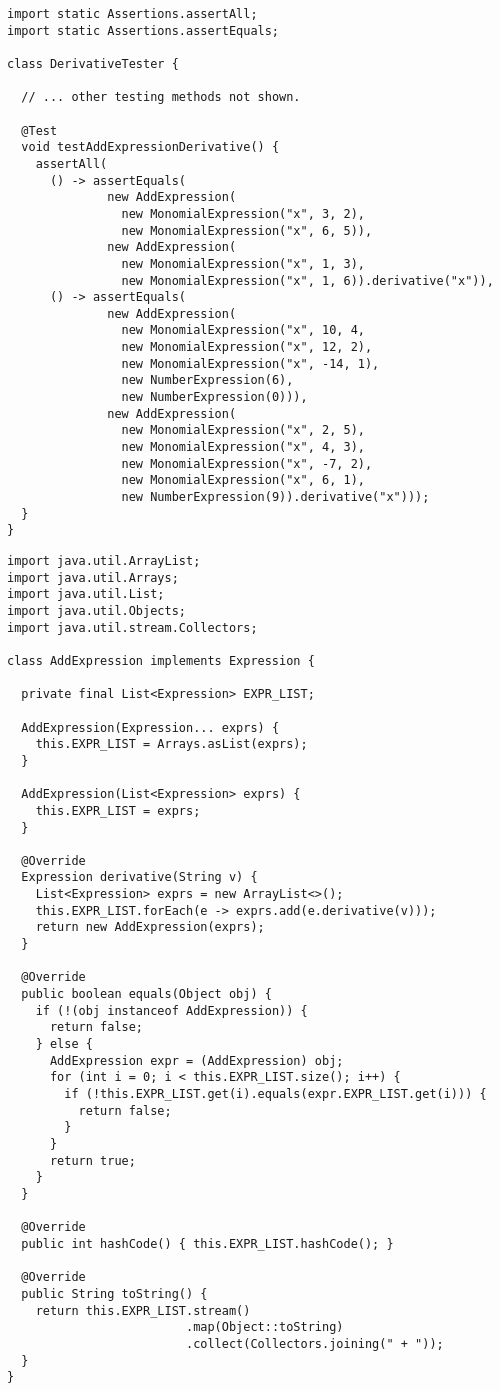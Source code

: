 \begin{lstlisting}[language=MyJava]
import static Assertions.assertAll;
import static Assertions.assertEquals;
  
class DerivativeTester {
  
  // ... other testing methods not shown.

  @Test
  void testAddExpressionDerivative() {
    assertAll(
      () -> assertEquals(
              new AddExpression(
                new MonomialExpression("x", 3, 2),
                new MonomialExpression("x", 6, 5)),
              new AddExpression(
                new MonomialExpression("x", 1, 3),
                new MonomialExpression("x", 1, 6)).derivative("x")),
      () -> assertEquals(
              new AddExpression(
                new MonomialExpression("x", 10, 4,
                new MonomialExpression("x", 12, 2),
                new MonomialExpression("x", -14, 1),
                new NumberExpression(6),
                new NumberExpression(0))),
              new AddExpression(
                new MonomialExpression("x", 2, 5),
                new MonomialExpression("x", 4, 3),
                new MonomialExpression("x", -7, 2),
                new MonomialExpression("x", 6, 1),
                new NumberExpression(9)).derivative("x")));
  }
}
\end{lstlisting}

\begin{lstlisting}[language=MyJava]
import java.util.ArrayList;
import java.util.Arrays;
import java.util.List;
import java.util.Objects;
import java.util.stream.Collectors;

class AddExpression implements Expression {

  private final List<Expression> EXPR_LIST;

  AddExpression(Expression... exprs) {
    this.EXPR_LIST = Arrays.asList(exprs);
  }

  AddExpression(List<Expression> exprs) { 
    this.EXPR_LIST = exprs; 
  }

  @Override
  Expression derivative(String v) {
    List<Expression> exprs = new ArrayList<>();
    this.EXPR_LIST.forEach(e -> exprs.add(e.derivative(v)));
    return new AddExpression(exprs);
  }

  @Override
  public boolean equals(Object obj) {
    if (!(obj instanceof AddExpression)) { 
      return false; 
    } else { 
      AddExpression expr = (AddExpression) obj;
      for (int i = 0; i < this.EXPR_LIST.size(); i++) {
        if (!this.EXPR_LIST.get(i).equals(expr.EXPR_LIST.get(i))) { 
          return false; 
        }
      }
      return true;
    }
  }

  @Override
  public int hashCode() { this.EXPR_LIST.hashCode(); }

  @Override
  public String toString() { 
    return this.EXPR_LIST.stream()
                         .map(Object::toString)
                         .collect(Collectors.joining(" + "));
  }
}
\end{lstlisting}
